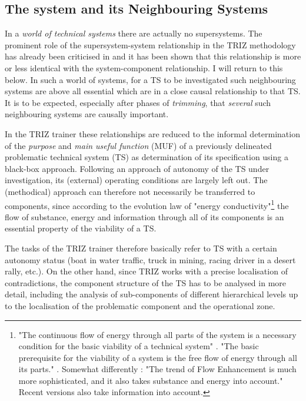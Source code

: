 \documentclass[11pt,a4paper]{article}
\begin{document}
\subsection*{The system and its Neighbouring Systems}

In a \emph{world of technical systems} there are actually no supersystems.
The prominent role of the supersystem-system relationship in the TRIZ
methodology has already been criticised in \cite[p. 16]{Graebe2020} and it has
been shown that this relationship is more or less identical with the
system-component relationship. I will return to this below.  In such a world
of systems, for a TS to be investigated such neighbouring systems are above
all essential which are in a close causal relationship to that TS.  It is to
be expected, especially after phases of \emph{trimming}, that \emph{several}
such neighbouring systems are causally important.  

In the TRIZ trainer \cite{TT} these relationships are reduced to the informal
determination of the \emph{purpose} and \emph{main useful function} (MUF) of a
previously delineated problematic technical system (TS) as determination of
its specification using a black-box approach.  Following an approach of
autonomy of the TS under investigation, its (external) operating conditions
are largely left out. The (methodical) approach can therefore not necessarily
be transferred to components, since according to the evolution law of "energy
conductivity"\footnote{"The continuous flow of energy through all parts of the
  system is a necessary condition for the basic viability of a technical
  system" \cite[p. 125]{Altshuller1983}. "The basic prerequisite for the
  viability of a system is the free flow of energy through all its parts."
  \cite[p. 172]{Koltze2017}. Somewhat differently \cite[p. 86]{TESE2018}: "The
  trend of Flow Enhancement is much more sophisticated, and it also takes
  substance and energy into account."  Recent versions also take information
  into account.} the flow of substance, energy and information through all of
its components is an essential property of the viability of a TS.

The tasks of the TRIZ trainer therefore basically refer to TS with a certain
autonomy status (boat in water traffic, truck in mining, racing driver in a
desert rally, etc.). On the other hand, since TRIZ works with a precise
localisation of contradictions, the component structure of the TS has to be
analysed in more detail, including the analysis of sub-components of different
hierarchical levels up to the localisation of the problematic component and
the operational zone.
\end{document}
